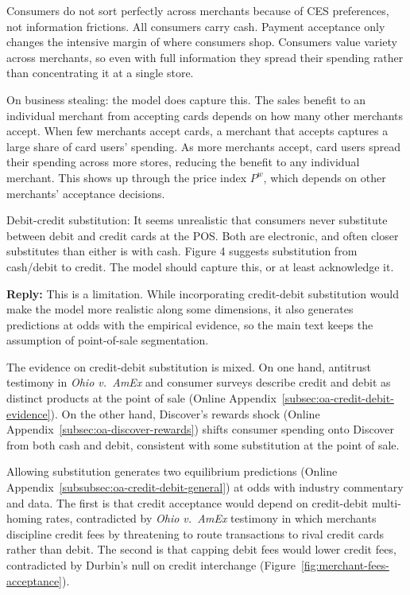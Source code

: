 \documentclass[main.tex]{subfiles}
\begin{document}
\begin{refsection}
Consumers do not sort perfectly across merchants because of CES preferences, not information frictions.
All consumers carry cash. 
Payment acceptance only changes the intensive margin of where consumers shop.
Consumers value variety across merchants, so even with full information they spread their spending rather than concentrating it at a single store.

On business stealing: the model does capture this.
The sales benefit to an individual merchant from accepting cards depends on how many other merchants accept.
When few merchants accept cards, a merchant that accepts captures a large share of card users' spending.
As more merchants accept, card users spread their spending across more stores, reducing the benefit to any individual merchant.
This shows up through the price index $P^w$, which depends on other merchants' acceptance decisions.

\begin{refcommentnoclear}
Debit-credit substitution: It seems unrealistic that consumers never substitute between debit and credit cards at the POS.
Both are electronic, and often closer substitutes than either is with cash.
Figure 4 suggests substitution from cash/debit to credit.
The model should capture this, or at least acknowledge it.
\end{refcommentnoclear}

\textbf{Reply:} This is a limitation.
While incorporating credit-debit substitution would make the model more realistic along some dimensions, it also generates predictions at odds with the empirical evidence, so the main text keeps the assumption of point-of-sale segmentation.

The evidence on credit-debit substitution is mixed.
On one hand, antitrust testimony in \emph{Ohio v.\ AmEx} and consumer surveys describe credit and debit as distinct products at the point of sale (Online Appendix~\ref{subsec:oa-credit-debit-evidence}).
On the other hand, Discover's rewards shock (Online Appendix~\ref{subsec:oa-discover-rewards}) shifts consumer spending onto Discover from both cash and debit, consistent with some substitution at the point of sale.

Allowing substitution generates two equilibrium predictions (Online Appendix~\ref{subsubsec:oa-credit-debit-general}) at odds with industry commentary and data.
The first is that credit acceptance would depend on credit-debit multi-homing rates, contradicted by \emph{Ohio v.\ AmEx} testimony in which merchants discipline credit fees by threatening to route transactions to rival credit cards rather than debit.
The second is that capping debit fees would lower credit fees, contradicted by Durbin's null on credit interchange (Figure~\ref{fig:merchant-fees-acceptance}).


\end{refsection}
\end{document}
